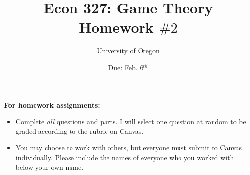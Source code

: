 \documentclass[addpoints ]{exam}
\title{
    \textbf{Econ 327: Game Theory} \\ 
    Homework $\#2$
    }
\author{University of Oregon}
\date{Due: Feb. 6$^{th}$}
\begin{document}
\maketitle

\begin{center}
  \gradetable[h][questions]
\end{center}

\vspace{0.5in}

\begin{center}
  \textbf{For homework assignments:}
\end{center}

\begin{itemize}


  \item Complete \textit{all} questions and parts.
  I will select one question at random to be graded
  according to the rubric on Canvas.

  \item You may choose to work with others,
  but everyone must submit to Canvas individually.
  Please include the names of everyone who you worked with 
  below your own name.
 
\end{itemize}

\vspace{1.0in}


\vspace{0.5in}


\newpage
\end{document}

